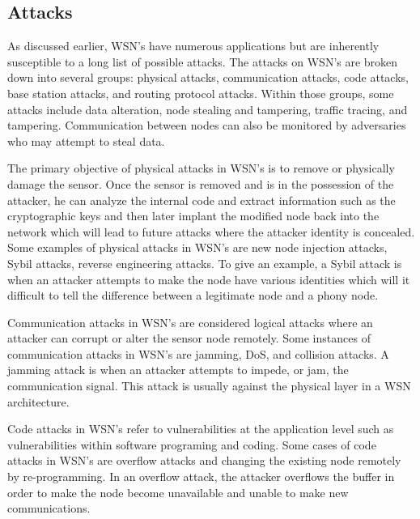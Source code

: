 \subsection {Attacks}
\smallskip

As discussed earlier, WSN’s have numerous applications but are inherently susceptible to a long list of possible attacks. The attacks on WSN’s are broken down into several groups: physical attacks, communication attacks, code attacks, base station attacks, and routing protocol attacks. Within those groups, some attacks include data alteration, node stealing and tampering, traffic tracing, and tampering. Communication between nodes can also be monitored by adversaries who may attempt to steal data. 

\smallskip

The primary objective of physical attacks in WSN’s is to remove or physically damage the sensor. Once the sensor is removed and is in the possession of the attacker, he can analyze the internal code and extract information such as the cryptographic keys and then later implant the modified node back into the network which will lead to future attacks where the attacker identity is concealed. Some examples of physical attacks in WSN’s are new node injection attacks, Sybil attacks, reverse engineering attacks. To give an example, a Sybil attack is when an attacker attempts to make the node have various identities which will it difficult to tell the difference between a legitimate node and a phony node.

\smallskip

Communication attacks in WSN’s are considered logical attacks where an attacker can corrupt or alter the sensor node remotely. Some instances of communication attacks in WSN’s are jamming, DoS, and collision attacks. A jamming attack is when an attacker attempts to impede, or jam, the communication signal. This attack is usually against the physical layer in a WSN architecture. 

\smallskip

Code attacks in WSN’s refer to vulnerabilities at the application level such as vulnerabilities within software programing and coding. Some cases of code attacks in WSN’s are overflow attacks and changing the existing node remotely by re-programming. In an overflow attack, the attacker overflows the buffer in order to make the node become unavailable and unable to make new communications. 

\smallskip

